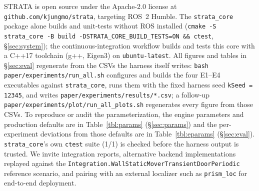 \documentclass[conference]{IEEEtran}
\begin{document}
STRATA is open source under the Apache-2.0 license at
\texttt{github.com/kjungmo/strata}, targeting ROS~2 Humble. The \texttt{strata\_core}
package alone builds and unit-tests without ROS installed
(\texttt{cmake -S strata\_core -B build -DSTRATA\_CORE\_BUILD\_TESTS=ON \&\& ctest}, \S\ref{sec:system});
the continuous-integration workflow builds and tests this core with a C++17
toolchain (g++, Eigen3) on \texttt{ubuntu-latest}.
All figures and tables in \S\ref{sec:eval} regenerate from the CSVs the harness itself
writes: \texttt{bash paper/experiments/run\_all.sh} configures and builds the four
E1--E4 executables against \texttt{strata\_core}, runs them with the fixed harness
seed \texttt{kSeed = 12345}, and writes \texttt{paper/experiments/results/*.csv}; a
follow-up \texttt{paper/experiments/plot/run\_all\_plots.sh} regenerates every figure
from those CSVs. To reproduce or audit the parameterization, the engine
parameters and production defaults are in Table~\ref{tbl:params} (\S\ref{sec:params}) and the
per-experiment deviations from those defaults are in Table~\ref{tbl:eparams} (\S\ref{sec:eval}).
\texttt{strata\_core}'s own \texttt{ctest} suite (1/1) is checked before
the harness output is trusted. We invite integration reports, alternative
backend implementations replayed against the
\texttt{Integration.WallStaticMoverTransientDoorPeriodic} reference scenario,
and pairing with an external localizer such as \texttt{prism\_loc} for end-to-end
deployment.



\end{document}
